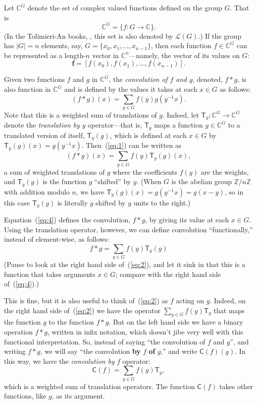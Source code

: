 \documentclass[reqno,onecolumn,oneside]{paper}
\newcommand{\<}{\ensuremath{\langle}}
\renewcommand{\>}{\ensuremath{\rangle}}
\newcommand{\field}[1]{\ensuremath{\mathbb{#1}}}
\newcommand{\Z}{\field{Z}}                   %
\newcommand{\C}{\field{C}}                   %
\newcommand{\vs}[1]{\ensuremath{\mathcal{#1}}}
\newcommand\sL{\vs{L}}
\newcommand{\lt}[1]{\ensuremath{\mathsf{#1}}}
\newcommand{\T}{\lt{T}}       %
\newcommand\conv{\lt{C}}
\newcommand\vf{\ensuremath{\mathbf{f}}}
\begin{document}
Let $\C^G$ denote the set of complex valued functions defined on the group
$G$.  That is 
\[
\C^G = \{f : G\rightarrow \C \}.
\]
(In the Tolimieri-An books, \cite{Tolimieri:1998} \cite{Tolimieri:2003}, this set is also denoted by
$\sL(G)$.)  If the group has $|G| = n$ elements, say, 
$G = \{x_0, x_1, \dots, x_{n-1}\}$, 
then each function $f\in  \C^G$ can be represented as
a length-$n$ vector in $\C^n$---namely, the vector of its values on $G$:
\[
\vf = [f(x_0), f(x_1), \dots, f(x_{n-1})].
\]

Given two functions $f$ and $g$ in $\C^G$, the \emph{convolution of
$f$ and $g$}, denoted, $f*g$, is also function in $\C^G$ and is
defined by the values it takes at each $x\in G$ as follows:
\begin{equation}
\label{eq:1}  
(f*g)(x) = \sum_{y \in G} f(y) g(y^{-1}x).
\end{equation}
Note that this is a weighted sum of translations of $g$.
Indeed, let $\T_y: \C^G\rightarrow \C^G$ denote
the \emph{translation by $y$} operator---that is, $\T_y$ maps 
a function $g\in \C^G$ to a translated version of itself, $\T_y(g)$, which is defined at each 
$x \in G$ by $\T_y(g)(x) = g(y^{-1}x)$.
Then~(\ref{eq:1}) can be written as
\begin{equation}
\label{eq:4}  
(f*g)(x) = \sum_{y \in G} f(y) \T_y(g)(x),
\end{equation}
a sum of weighted translations of $g$ where 
the coefficients $f(y)$ are the weights, and 
$\T_y(g)$ is the function $g$ ``shifted'' by $y$. (When $G$ is the abelian
group $\Z/n\Z$ with addition modulo $n$, we have
$\T_y(g)(x) = g(y^{-1}x) = g(x-y)$, so in this case
$\T_y(g)$ is literally $g$ shifted by $y$ units to the right.)

Equation~(\ref{eq:4}) defines the convolution, $f * g$, by giving its
value at each $x\in G$. Using the 
translation operator, however, we can define convolution
 ``functionally,'' instead of element-wise, as follows:
\begin{equation}
\label{eq:2}  
f*g = \sum_{y \in G} f(y) \T_y(g)
\end{equation}
(Pause to look at the right hand side of~(\ref{eq:2}), and let it sink in that
this is a function that takes arguments $x\in G$; compare with the right
hand side of~(\ref{eq:4}).)

 This is fine, but it is also useful to think of~(\ref{eq:2}) as $f$ acting
on $g$.  Indeed, on the right hand side of~(\ref{eq:2}) we have the operator 
$\sum_{y \in G} f(y) \T_y$ that maps the function $g$ to the function $f*g$.  But
on the left hand side we have a binary operation $f*g$, written in infix
notation, which doesn't jibe very well with this functional interpretation.  So,
instead of saying ``the convolution of $f$ and $g$'', and writing $f*g$, we will
say
``the convolution {\bf by} $f$ {\bf of} $g$,'' and write $\conv(f)(g)$. In this
way, we have the \emph{convolution by $f$} operator:
\begin{equation}
\label{eq:3}  
\conv(f) = \sum_{y \in G} f(y) \T_y,
\end{equation}
which is a weighted sum of translation operators.  The function $\conv(f)$ takes other
functions, like $g$, as its argument.
\end{document}
